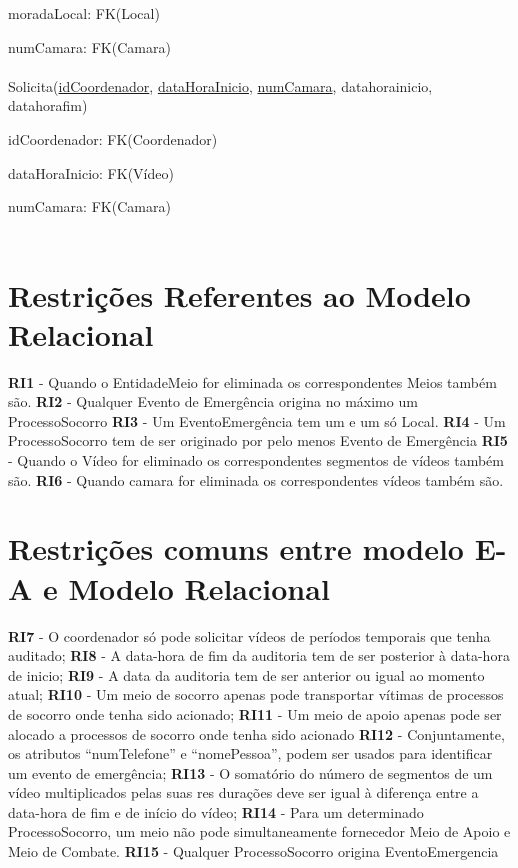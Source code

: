 \documentclass[12pt,a4paper]{article}
\begin{document}
moradaLocal: FK(Local)

numCamara: FK(Camara) \\\\
Solicita(\underline{idCoordenador}, \underline{dataHoraInicio}, \underline{numCamara}, datahorainicio, datahorafim)

idCoordenador: FK(Coordenador)

dataHoraInicio: FK(Vídeo) 

numCamara: FK(Camara) \\\\

\section{Restrições Referentes ao Modelo Relacional}


\textbf{RI1} - Quando o EntidadeMeio for eliminada os correspondentes Meios também são.
\textbf{RI2} - Qualquer Evento de Emergência origina no máximo um ProcessoSocorro
\textbf{RI3} - Um EventoEmergência tem um e um só Local.
\textbf{RI4} - Um ProcessoSocorro tem de ser originado por pelo menos Evento de Emergência
\textbf{RI5} - Quando o Vídeo for eliminado os correspondentes segmentos de vídeos também são.
\textbf{RI6} - Quando camara for eliminada os correspondentes vídeos também são.


\section{Restrições comuns entre modelo E-A e Modelo Relacional}
\textbf{RI7} - O coordenador só pode solicitar vídeos de períodos temporais que tenha auditado;
\textbf{RI8} - A data-hora de fim da auditoria tem de ser posterior à data-hora de inicio;
\textbf{RI9} - A data da auditoria tem de ser anterior ou igual ao momento atual;
\textbf{RI10} - Um meio de socorro apenas pode transportar vítimas de processos de socorro onde
tenha sido acionado;
\textbf{RI11} - Um meio de apoio apenas pode ser alocado a processos de socorro onde tenha sido acionado
\textbf{RI12} - Conjuntamente, os atributos “numTelefone” e “nomePessoa”, podem ser usados para
identificar um evento de emergência;
\textbf{RI13} - O somatório do número de segmentos de um vídeo multiplicados pelas suas res
durações deve ser igual à diferença entre a data-hora de fim e de início do vídeo;
\textbf{RI14} - Para um determinado ProcessoSocorro, um meio não pode simultaneamente
fornecedor Meio de Apoio e Meio de Combate.
\textbf{RI15} - Qualquer ProcessoSocorro origina EventoEmergencia \\
\end{document}
